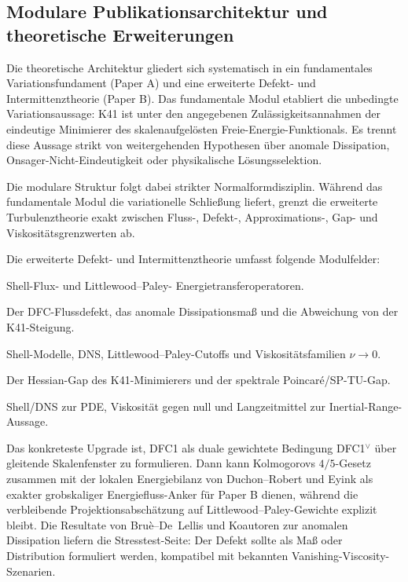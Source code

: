 \documentclass[12pt,a4paper]{article}
\theoremstyle{breakdef}
\theoremstyle{breakplain}
\theoremstyle{breakdef}
\begin{document}
\subsection{Modulare Publikationsarchitektur und theoretische Erweiterungen}
\label{subsec:zookeeper-turbulence-transfer}

Die theoretische Architektur gliedert sich systematisch in ein fundamentales
Variationsfundament (Paper A) und eine erweiterte Defekt- und Intermittenztheorie (Paper B).
Das fundamentale Modul etabliert die unbedingte Variationsaussage: K41 ist unter den
angegebenen Zulässigkeitsannahmen der eindeutige Minimierer des skalenaufgelösten
Freie-Energie-Funktionals. Es trennt diese Aussage strikt von weitergehenden Hypothesen
über anomale Dissipation, Onsager-Nicht-Eindeutigkeit oder physikalische Lösungsselektion.

Die modulare Struktur folgt dabei strikter Normalformdisziplin. Während das fundamentale
Modul die variationelle Schließung liefert, grenzt die erweiterte Turbulenztheorie
exakt zwischen Fluss-, Defekt-, Approximations-, Gap- und Viskositätsgrenzwerten ab.

Die erweiterte Defekt- und Intermittenztheorie umfasst folgende Modulfelder:
\begin{description}[style=nextline,leftmargin=3.4cm,labelwidth=3.0cm]
  \item[Operator/Form.] Shell-Flux- und Littlewood--Paley-
  Energietransferoperatoren.
  \item[Defekt.] Der DFC-Flussdefekt, das anomale Dissipationsmaß
  und die Abweichung von der K41-Steigung.
  \item[Approximation.] Shell-Modelle, DNS, Littlewood--Paley-Cutoffs und
  Viskositätsfamilien $\nu\to0$.
  \item[Gap.] Der Hessian-Gap des K41-Minimierers und der spektrale
  Poincaré/SP-TU-Gap.
  \item[Grenzübergang.] Shell/DNS zur PDE, Viskosität gegen null und
  Langzeitmittel zur Inertial-Range-Aussage.
\end{description}

Das konkreteste Upgrade ist, DFC1 als duale gewichtete Bedingung
DFC1$^\vee$ über gleitende Skalenfenster zu formulieren. Dann kann
Kolmogorovs $4/5$-Gesetz zusammen mit der lokalen Energiebilanz von
Duchon--Robert und Eyink als exakter grobskaliger Energiefluss-Anker für
Paper B dienen, während die verbleibende Projektionsabschätzung auf
Littlewood--Paley-Gewichte explizit bleibt. Die Resultate von Bruè--De~Lellis
 und Koautoren zur anomalen Dissipation liefern die Stresstest-Seite:
Der Defekt sollte als Maß oder Distribution formuliert werden, kompatibel
mit bekannten Vanishing-Viscosity-Szenarien.
\end{document}
